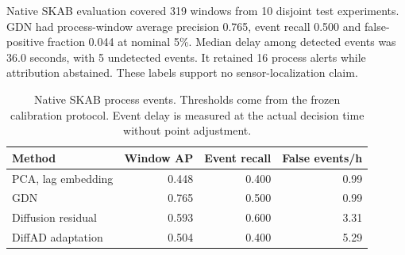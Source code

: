 Native SKAB evaluation covered 319 windows from 10 disjoint test experiments. GDN had process-window average precision 0.765, event recall 0.500 and false-positive fraction 0.044 at nominal 5\%. Median delay among detected events was 36.0 seconds, with 5 undetected events. It retained 16 process alerts while attribution abstained. These labels support no sensor-localization claim.

\begin{table}[t]
\centering\small
\setlength{\tabcolsep}{4pt}
\caption{Native SKAB process events. Thresholds come from the frozen calibration protocol. Event delay is measured at the actual decision time without point adjustment.}\label{tab:native}
\begin{tabular}{lrrr}
\toprule
Method & Window AP & Event recall & False events/h \\
\midrule
PCA, lag embedding & 0.448 & 0.400 & 0.99 \\
GDN & 0.765 & 0.500 & 0.99 \\
Diffusion residual & 0.593 & 0.600 & 3.31 \\
DiffAD adaptation & 0.504 & 0.400 & 5.29 \\
\bottomrule
\end{tabular}
\end{table}
